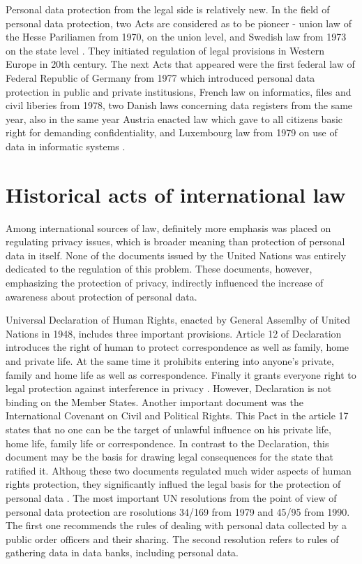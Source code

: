 \documentclass[en, noamssymb]{mgr}
\begin{document}
\indent Personal data protection from the legal side is relatively new. In the field of personal data protection, two Acts are considered as to be pioneer - union law of the Hesse Pariliamen from 1970, on the union level, and Swedish law from 1973 on the state level \cite{prawo_odo}. They initiated regulation of legal provisions in Western Europe 
in 20th century. The next Acts that appeared were the first federal law of Federal Republic of Germany from 1977  which introduced personal data protection in public and private institusions, French law on informatics, files and civil liberies from 1978, two Danish laws concerning data registers from the same year, also in the same year Austria enacted law which gave to all citizens basic right for demanding confidentiality, and Luxembourg law from 1979 on use of data in informatic systems \cite{prawo_odo}.



\section{Historical acts of international law}

\indent Among international sources of law, definitely more emphasis was placed on regulating privacy issues, which is broader meaning than protection of personal data in itself. None of the documents issued by the United Nations was entirely dedicated to the regulation of this problem. These documents, however, emphasizing the protection of privacy, indirectly influenced the increase of awareness about protection of personal data.

\indent Universal Declaration of Human Rights, enacted by General Assemlby of United Nations in 1948, includes three important provisions. Article 12 of Declaration introduces the right of human to protect correspondence as well as family, home and private life. At the same time it prohibits entering into anyone's private, family and home life as well as correspondence. Finally it grants everyone right to legal protection against interference in privacy \cite{prawo_odo}. However, Declaration is not binding on the Member States. Another important document was the International Covenant on Civil and Political Rights. This Pact in the article 17 states that no one can be the target of unlawful influence on his private life, home life, family life or correspondence. In contrast to the Declaration, this document may be the basis for drawing legal consequences for the state that ratified it. Althoug these two documents regulated much wider aspects of human rights protection, they significantly influed the legal basis for the protection of personal data \cite{prawo_odo}. The most important UN resolutions from the point of view of personal data protection are rosolutions 34/169 from 1979 and 45/95 from 1990. The first one recommends the rules of dealing with personal data collected by a public order officers and their sharing. The second resolution refers to rules of gathering data in data banks, including personal data.
\end{document}
